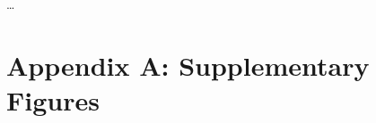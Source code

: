 \documentclass[11pt]{article}
\begin{document}
\ldots




\newpage{}

\section*{Appendix A: Supplementary Figures}

%
%
%
%
%

\renewcommand{\theequation}{A\arabic{equation}}
\renewcommand{\thetable}{A\arabic{table}}
\setcounter{equation}{0}  %
\setcounter{figure}{0}
\setcounter{table}{0}
\end{document}
